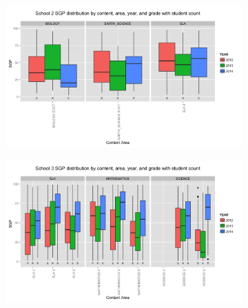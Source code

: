 \documentclass[12pt]{article}
\begin{document}
\pagebreak

\begin{figure}[H]
  \begin{subfigure}[b]{\textwidth}
    \includegraphics[width=\textwidth]{../img/Appendices/Appendix_C/School_MSGP_Dist_Boxplot-2.png}
  \end{subfigure}
  \begin{subfigure}[b]{\textwidth}
    \includegraphics[width=\textwidth]{../img/Appendices/Appendix_C/School_MSGP_Dist_Boxplot-3.png}
  \end{subfigure}
\end{figure}

\pagebreak
\end{document}
